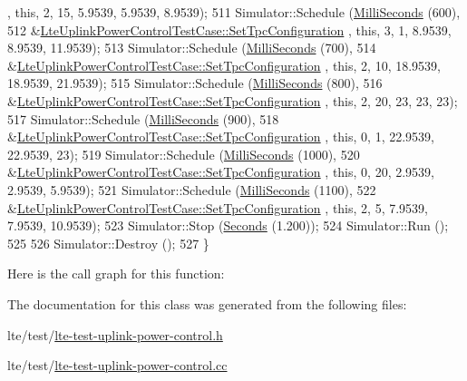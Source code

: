 \begin{DoxyCode}
      , \textcolor{keyword}{this}, 2, 15, 5.9539, 5.9539, 8.9539);
511   Simulator::Schedule (\hyperlink{group__timecivil_gaf26127cf4571146b83a92ee18679c7a9}{MilliSeconds} (600),
512                        &\hyperlink{classLteUplinkPowerControlTestCase_a91e2e46a5fa22677a33d5328ac9789b8}{LteUplinkPowerControlTestCase::SetTpcConfiguration}
      , \textcolor{keyword}{this}, 3, 1, 8.9539, 8.9539, 11.9539);
513   Simulator::Schedule (\hyperlink{group__timecivil_gaf26127cf4571146b83a92ee18679c7a9}{MilliSeconds} (700),
514                        &\hyperlink{classLteUplinkPowerControlTestCase_a91e2e46a5fa22677a33d5328ac9789b8}{LteUplinkPowerControlTestCase::SetTpcConfiguration}
      , \textcolor{keyword}{this}, 2, 10, 18.9539, 18.9539, 21.9539);
515   Simulator::Schedule (\hyperlink{group__timecivil_gaf26127cf4571146b83a92ee18679c7a9}{MilliSeconds} (800),
516                        &\hyperlink{classLteUplinkPowerControlTestCase_a91e2e46a5fa22677a33d5328ac9789b8}{LteUplinkPowerControlTestCase::SetTpcConfiguration}
      , \textcolor{keyword}{this}, 2, 20, 23, 23, 23);
517   Simulator::Schedule (\hyperlink{group__timecivil_gaf26127cf4571146b83a92ee18679c7a9}{MilliSeconds} (900),
518                        &\hyperlink{classLteUplinkPowerControlTestCase_a91e2e46a5fa22677a33d5328ac9789b8}{LteUplinkPowerControlTestCase::SetTpcConfiguration}
      , \textcolor{keyword}{this}, 0, 1, 22.9539, 22.9539, 23);
519   Simulator::Schedule (\hyperlink{group__timecivil_gaf26127cf4571146b83a92ee18679c7a9}{MilliSeconds} (1000),
520                        &\hyperlink{classLteUplinkPowerControlTestCase_a91e2e46a5fa22677a33d5328ac9789b8}{LteUplinkPowerControlTestCase::SetTpcConfiguration}
      , \textcolor{keyword}{this}, 0, 20, 2.9539, 2.9539, 5.9539);
521   Simulator::Schedule (\hyperlink{group__timecivil_gaf26127cf4571146b83a92ee18679c7a9}{MilliSeconds} (1100),
522                        &\hyperlink{classLteUplinkPowerControlTestCase_a91e2e46a5fa22677a33d5328ac9789b8}{LteUplinkPowerControlTestCase::SetTpcConfiguration}
      , \textcolor{keyword}{this}, 2, 5, 7.9539, 7.9539, 10.9539);
523   Simulator::Stop (\hyperlink{group__timecivil_ga33c34b816f8ff6628e33d5c8e9713b9e}{Seconds} (1.200));
524   Simulator::Run ();
525 
526   Simulator::Destroy ();
527 \}
\end{DoxyCode}


Here is the call graph for this function\+:




The documentation for this class was generated from the following files\+:\begin{DoxyCompactItemize}
\item 
lte/test/\hyperlink{lte-test-uplink-power-control_8h}{lte-\/test-\/uplink-\/power-\/control.\+h}\item 
lte/test/\hyperlink{lte-test-uplink-power-control_8cc}{lte-\/test-\/uplink-\/power-\/control.\+cc}\end{DoxyCompactItemize}
